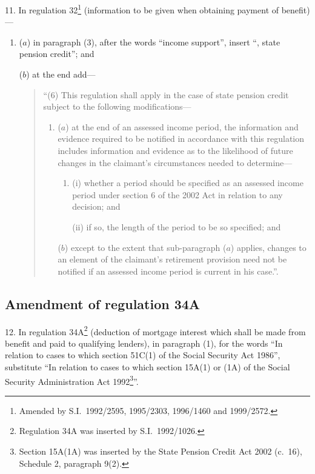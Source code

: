 \documentclass[12pt,a4paper]{article}
\begin{document}
11.  In regulation 32\footnote{Amended by S.I.\ 1992/2595, 1995/2303, 1996/1460 and 1999/2572.} (information to be given when obtaining payment of benefit)—
\begin{enumerate}\item[]
($a$) in paragraph (3), after the words “income support”, insert “, state pension credit”; and

($b$) at the end add—
\begin{quotation}
“(6) This regulation shall apply in the case of state pension credit subject to the following modifications—
\begin{enumerate}\item[]
($a$) at the end of an assessed income period, the information and evidence required to be notified in accordance with this regulation includes information and evidence as to the likelihood of future changes in the claimant’s circumstances needed to determine—
\begin{enumerate}\item[]
(i) whether a period should be specified as an assessed income period under section 6 of the 2002 Act in relation to any decision; and

(ii) if so, the length of the period to be so specified; and
\end{enumerate}

($b$) except to the extent that sub-paragraph ($a$)  applies, changes to an element of the claimant’s retirement provision need not be notified if an assessed income period is current in his case.”.
\end{enumerate}
\end{quotation}
\end{enumerate}

\subsection[12. Amendment of regulation 34A]{Amendment of regulation 34A}

12.  In regulation 34A\footnote{Regulation 34A was inserted by S.I.\ 1992/1026.} (deduction of mortgage interest which shall be made from benefit and paid to qualifying lenders), in paragraph (1), for the words “In relation to cases to which section 51C(1) of the Social Security Act 1986”, substitute “In relation to cases to which section 15A(1) or (1A) of the Social Security Administration Act 1992\footnote{Section 15A(1A) was inserted by the State Pension Credit Act 2002 (c.\ 16), Schedule 2, paragraph 9(2).}”.
\end{document}
